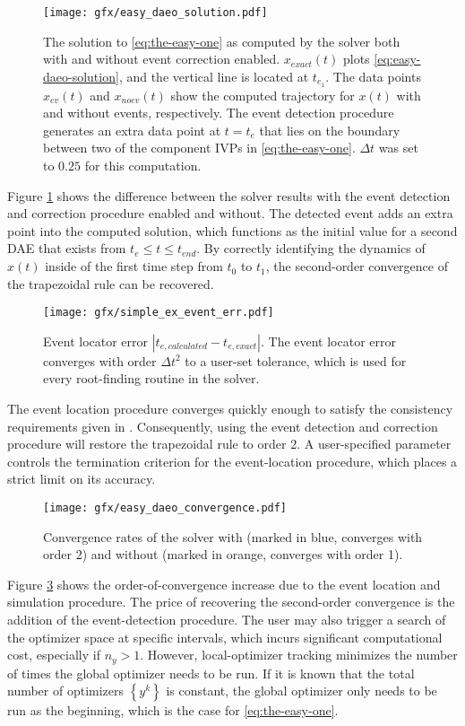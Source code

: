 \documentclass[twoside,leqno, twocolumn]{article}
\newcommand{\abs}[1]{\ensuremath{\left|#1\right|}}
\begin{document}
\begin{figure}[h]
	\centering
	\texttt{[image: gfx/easy\_daeo\_solution.pdf]}
	\caption{The solution to \eqref{eq:the-easy-one} as computed by the solver both with and without event correction enabled. $x_{exact}(t)$ plots \eqref{eq:easy-daeo-solution}, and the vertical line is located at $t_{e_1}$. The data points $x_{ev}(t)$ and $x_{noev}(t)$ show the computed trajectory for $x(t)$ with and without events, respectively.  The event detection procedure generates an extra data point at $t={t_e}$ that lies on the boundary between two of the component IVPs in \eqref{eq:the-easy-one}. $\Delta t$ was set to $0.25$ for this computation.}
	\label{fig:easy-example-solution}
\end{figure}
Figure \ref{fig:easy-example-solution} shows the difference between the solver results with the event detection and correction procedure enabled and without. The detected event adds an extra point into the computed solution, which functions as the initial value for a second DAE that exists from $t_{e} \leq t \leq t_{end}$. By correctly identifying the dynamics of $x(t)$ inside of the first time step from $t_0$ to $t_1$, the second-order convergence of the trapezoidal rule can be recovered.

\begin{figure}[h]
	\centering
	\texttt{[image: gfx/simple\_ex\_event\_err.pdf]}
	\caption{Event locator error $\abs{t_{e, calculated} - t_{e, exact}}$. The event locator error converges with order $\Delta t^2$ to a user-set tolerance, which is used for every root-finding routine in the solver.}
	\label{fig:easy-event-location}
\end{figure}
The event location procedure converges quickly enough to satisfy the consistency requirements given in \cite{mannshardtOnestepMethodsAny1978}. Consequently, using the event detection and correction procedure will restore the trapezoidal rule to order 2. A user-specified parameter controls the termination criterion for the event-location procedure, which places a strict limit on its accuracy.

\begin{figure}[h]
	\centering
	\texttt{[image: gfx/easy\_daeo\_convergence.pdf]}
	\caption{Convergence rates of the solver with (marked in blue, converges with order 2) and without (marked in orange, converges with order 1).}
	\label{fig:easy-error-improvement}
\end{figure}
Figure \ref{fig:easy-error-improvement} shows the order-of-convergence increase due to the event location and simulation procedure. The price of recovering the second-order convergence is the addition of the event-detection procedure. The user may also trigger a search of the optimizer space at specific intervals, which incurs significant computational cost, especially if $n_y > 1$. However, local-optimizer tracking minimizes the number of times the global optimizer needs to be run. If it is known that the total number of optimizers $\left\{y^k\right\}$ is constant, the global optimizer only needs to be run as the beginning, which is the case for \eqref{eq:the-easy-one}.
\end{document}
